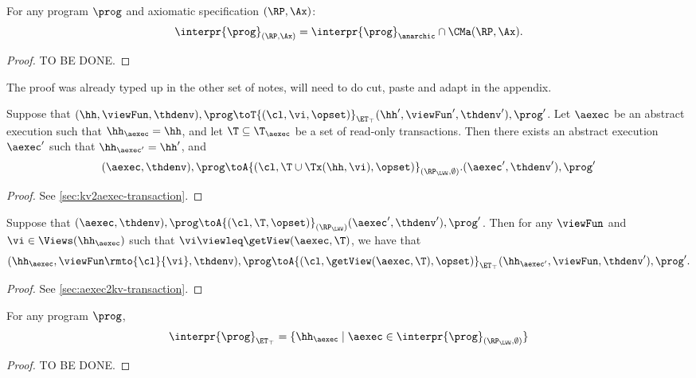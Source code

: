 \begin{theorem}
For any program $\prog$ and axiomatic specification $(\RP, \Ax)$:
\[
\interpr{\prog}_{(\RP, \Ax)} = \interpr{\prog}_{\anarchic} \cap \CMa(\RP, \Ax). 
\]
\end{theorem}
\begin{proof}
    TO BE DONE.
\end{proof}
\ac{The proof was already typed up in the other set of notes, will need to do 
cut, paste and adapt in the appendix.}



\begin{proposition}
\label{prop:kv2aexec_transition}
Suppose that $(\hh, \viewFun, \thdenv), \prog \toT{(\cl, \vi, \opset)}_{\ET_{\top}} (\hh', 
\viewFun', \thdenv'), \prog'$. Let $\aexec$ be an abstract execution 
such that $\hh_{\aexec} = \hh$, and let $\T \subseteq \T_{\aexec}$ be a 
set of read-only transactions. Then there exists an abstract execution $\aexec'$ 
such that $\hh_{\aexec'} = \hh'$, and 
\[
(\aexec, \thdenv), \prog \toA{(\cl, \T \cup \Tx(\hh, \vi), \opset)}_{(\RP_{\LWW}, \emptyset)}. 
(\aexec', \thdenv'), \prog'
\]
\end{proposition}
\begin{proof}
See \cref{sec:kv2aexec-transaction}.
\end{proof}

\begin{proposition}
\label{prop:aexec2kv_transition}
Suppose that $(\aexec, \thdenv), \prog \toA{(\cl, \T, \opset)}_{(\RP_{\LWW})} (\aexec', \thdenv'), \prog'$. 
Then for any $\viewFun$ and $\vi \in \Views(\hh_{\aexec})$ such that $\vi \viewleq \getView(\aexec, \T)$, 
we have that 
\[
(\hh_{\aexec}, \viewFun\rmto{\cl}{\vi}, \thdenv), \prog \toA{(\cl, \getView(\aexec, \T), \opset)}_{\ET_{\top}} (\hh_{\aexec'}, \viewFun, \thdenv'), \prog'.
\]
\end{proposition}
\begin{proof}
See \cref{sec:aexec2kv-transaction}.
\end{proof}

\begin{corollary}
For any program $\prog$, 
\[
\interpr{\prog}_{\ET_{\top}} = \{\hh_{\aexec} \mid \aexec \in \interpr{\prog}_{(\RP_{\LWW}, \emptyset)}\}
\]
\end{corollary}
\begin{proof}
    TO BE DONE.
\end{proof}


